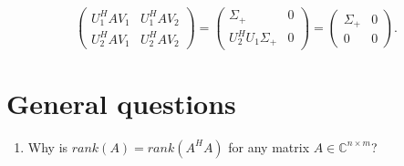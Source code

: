 \documentclass[a4paper, landscape,twocolumn,fontsize=9pt]{scrartcl}
\begin{document}
\begin{enumerate}
$$\begin{pmatrix}
    		U_1^HAV_1 & U_1^HAV_2 \\ U_2^HAV_1 & U_2^HAV_2
    	\end{pmatrix} = \begin{pmatrix}
    		\Sigma_+ & 0 \\ U_2^HU_1\Sigma_+ & 0
    	\end{pmatrix} = \begin{pmatrix}
    		\Sigma_+ & 0 \\ 0 & 0
    	\end{pmatrix}.$$
\end{enumerate}

\section*{General questions}
\begin{enumerate}
	\item Why is $rank(A) = rank(A^HA)$ for any matrix $A \in \mathbb C^{n \times m}$?
\end{enumerate}
\end{document}

